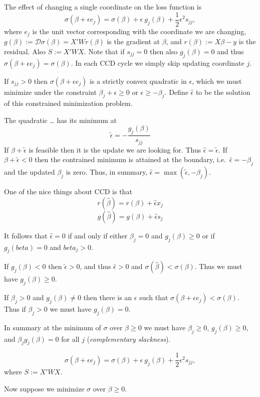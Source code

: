 \documentclass[
  12pt,
]{article}
\begin{document}
The effect of changing a single coordinate on the loss function is
\[
\sigma(\beta+\epsilon e_j)=\sigma(\beta)+\epsilon\ g_j(\beta)+\frac12\epsilon^2s_{jj},
\]
where \(e_j\) is the unit vector corresponding with the coordinate we are changing,
\(g(\beta):=\mathcal{D}\sigma(\beta)=X'Wr(\beta)\) is the gradient at \(\beta\), and \(r(\beta):=X\beta-y\) is the residual. Also \(S:=X'WX\). Note that if \(s_{jj}=0\)
then also \(g_j(\beta)=0\) and thus \(\sigma(\beta+\epsilon e_j)=\sigma(\beta)\).
In each CCD cycle we simply skip updating coordinate \(j\).

If \(s_{jj}>0\) then \(\sigma(\beta+\epsilon e_j)\) is a strictly convex quadratic
in \(\epsilon\), which we must minimize under the constraint \(\beta_j+\epsilon\geq 0\)
or \(\epsilon\geq-\beta_j\). Define \(\hat\epsilon\) to be the solution of this constrained minimization problem.

The quadratic \ldots{} has its minimum at
\[
\tilde\epsilon=-\frac{g_j(\beta)}{s_{jj}}
\]
If \(\beta+\tilde\epsilon\) is feasible then it is the update we are looking for. Thus \(\hat\epsilon=\tilde\epsilon\). If \(\beta+\tilde\epsilon<0\) then the contrained minimum is attained at the boundary, i.e.~\(\hat\epsilon=-\beta_j\) and the updated \(\beta_j\) is zero. Thus, in summary, \(\hat\epsilon=\max(\tilde\epsilon,-\beta_j)\).

One of the nice things about CCD is that
\[
r(\hat\beta)=r(\beta)+\hat\epsilon x_j
\]
\[
g(\hat\beta)=g(\beta)+\hat\epsilon s_j
\]

It follows that \(\hat\epsilon=0\) if and only if either \(\beta_j=0\) and \(g_j(\beta)\geq 0\) or if \(g_j(beta)=0\) and \(beta_j>0\).

If \(g_j(\beta)<0\) then \(\tilde\epsilon>0\), and thus \(\hat\epsilon>0\) and \(\sigma(\hat\beta)<\sigma(\beta)\). Thus we must have \(g_j(\beta)\geq 0\).

If \(\beta_j>0\) and \(g_j(\beta)\not=0\) then there is an \(\epsilon\) such that
\(\sigma(\beta+\epsilon e_j)<\sigma(\beta)\). Thus if \(\beta_j>0\) we must have
\(g_j(\beta)=0\).

In summary at the minimum of \(\sigma\) over \(\beta\geq 0\)
we must have \(\beta_j\geq 0\), \(g_j(\beta)\geq 0\), and
\(\beta_jg_j(\beta)=0\) for all \(j\) (\emph{complementary slackness}).

\[
\sigma(\beta+\epsilon e_j)=\sigma(\beta)+\epsilon\ g_j(\beta)+\frac12\epsilon^2s_{jj},
\]
where \(S:=X'WX\).

Now suppose we minimize \(\sigma\) over \(\beta\geq 0\).
\end{document}
